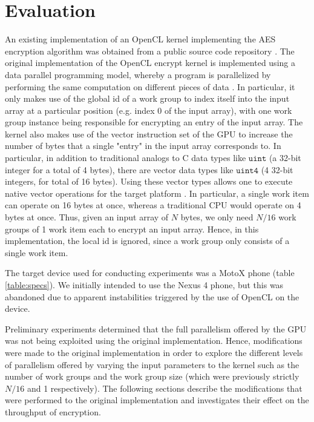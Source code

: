 \documentclass[conference,10pt]{IEEEtran}
\begin{document}

\section{Evaluation}

An existing implementation of an OpenCL kernel implementing the AES encryption algorithm was 
obtained from a public source code repository \cite{opencl_impl}.  The original implementation of 
the OpenCL encrypt kernel is implemented using a data parallel programming model, whereby a program 
is parallelized by performing the same computation on different pieces of data \cite{opencl_guide}.  
In particular, it only makes use of the global id of a work group to index itself into the input 
array at a particular position (e.g. index 0 of the input array), with one work group instance being 
responsible for encrypting an entry of the input array. The kernel also makes use of the vector 
instruction set of the GPU to increase the number of bytes that a single "entry" in the input array 
corresponds to. In particular, in addition to traditional analogs to C data types like 
$\mathtt{uint}$ (a 32-bit integer for a total of 4 bytes), there are vector data types like 
$\mathtt{uint4}$ (4 32-bit integers, for total of 16 bytes). Using these vector types allows one to 
execute native vector operations for the target platform \cite{opencl_guide}.  In particular, a 
single work item can operate on 16 bytes at once, whereas a traditional CPU would operate on 4 bytes 
at once. Thus, given an input array of $N$ bytes, we only need $N/16$ work groups of 1 work item 
each to encrypt an input array. Hence, in this implementation, the local id is ignored, since a work 
group only consists of a single work item.

The target device used for conducting experiments was a MotoX phone (table \ref{table:specs}).  We 
initially intended to use the Nexus 4 phone, but this was abandoned due to apparent instabilities 
triggered by the use of OpenCL on the device. 

Preliminary experiments determined that the full parallelism offered by the GPU was not being 
exploited using the original implementation.  Hence, modifications were made to the original 
implementation in order to explore the different levels of parallelism offered by varying the input 
parameters to the kernel such as the number of work groups and the work group size (which were 
previously strictly $N/16$ and 1 respectively).  The following sections describe the modifications 
that were performed to the original implementation and investigates their effect on the throughput 
of encryption.
\end{document}

